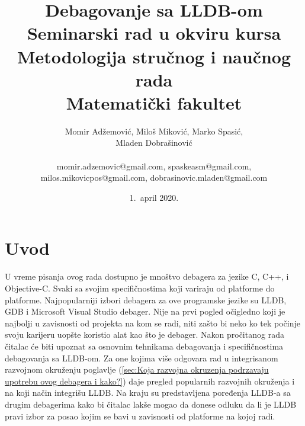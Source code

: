 \documentclass[a4paper]{article}
\begin{document}
\title{Debagovanje sa LLDB-om\\ \small{Seminarski rad u okviru kursa\\Metodologija stručnog i naučnog rada\\ Matematički fakultet}}

\author{Momir Adžemović, Miloš Miković, Marko Spasić,\\ Mladen Dobrašinović\\ \\ \small momir.adzemovic@gmail.com, spaskeasm@gmail.com,\\ \small milos.mikovicpos@gmail.com, dobrasinovic.mladen@gmail.com}

\date{1.~april 2020.}

\maketitle


\tableofcontents

\newpage

\section{Uvod}
\label{sec:uvod}

U vreme pisanja ovog rada dostupno je mnoštvo debagera za jezike C, C++, i Objective-C. Svaki sa svojim specifičnostima koji variraju od platforme do platforme. Najpopularniji izbori debagera za ove programske jezike su LLDB, GDB i Microsoft Visual Studio debager. Nije na prvi pogled očigledno koji je najbolji u zavisnosti od projekta na kom se radi, niti zašto bi neko ko tek počinje svoju karijeru uopšte koristio alat kao što je debager.
Nakon pročitanog rada čitalac će biti upoznat sa osnovnim tehnikama debagovanja i specifičnostima debagovanja sa LLDB-om. Za one kojima više odgovara rad u integrisanom razvojnom okruženju poglavlje (\ref{sec:Koja razvojna okruzenja podrzavaju upotrebu ovog debagera i kako?}) daje pregled popularnih razvojnih okruženja i na koji način integrišu LLDB. Na kraju su predstavljena poređenja LLDB-a sa drugim debagerima kako bi čitalac lakše mogao da donese odluku da li je LLDB pravi izbor za posao kojim se bavi u zavisnosti od platforme na kojoj radi. 
\end{document}
